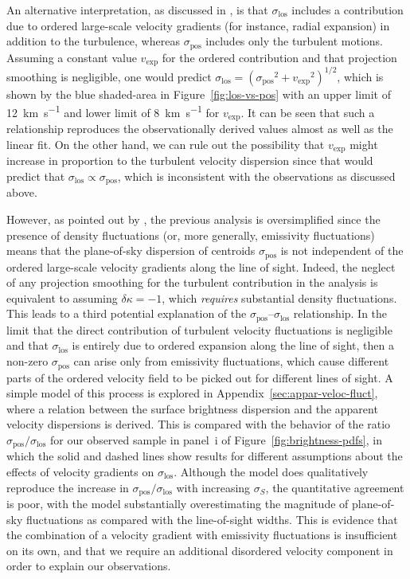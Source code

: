 \documentclass[fleqn,usenatbib, useAMS, a4paper]{mnras}
\newcommand\pos{\ensuremath{_{\mathrm{pos}}}}
\newcommand\los{\ensuremath{_{\mathrm{los}}}}
\begin{document}
\newcommand\vexp{\ensuremath{v_{\text{exp}}}}
An alternative interpretation,
as discussed in \citet{2011MNRAS.413..705L},
is that \(\sigma\los\) includes a contribution due to
ordered large-scale velocity gradients
(for instance, radial expansion)
in addition to the turbulence,
whereas \(\sigma\pos\) includes only the turbulent motions. 
Assuming a constant value \vexp{} for the ordered contribution
and that projection smoothing is negligible,
one would predict \(\sigma\los = (\sigma\pos^2 + \vexp^2)^{1/2}\),
which is shown by the blue shaded-area in Figure~\ref{fig:los-vs-pos}
with an upper limit of \SI{12}{km.s^{-1}} and lower limit of \SI{8}{km.s^{-1}} for \(\vexp\).
It can be seen that such a relationship reproduces the 
observationally derived values almost as well as the linear fit.
On the other hand, we can rule out the possibility that
\vexp{} might increase in proportion to the turbulent velocity dispersion
since that would predict that \(\sigma\los \propto \sigma\pos\),
which is inconsistent with the observations as discussed above.

However, as pointed out by \citet{arthur2016turbulence},
the previous analysis is oversimplified since the presence
of density fluctuations (or, more generally, emissivity fluctuations)
means that the plane-of-sky dispersion of centroids \(\sigma\pos\)
is not independent of the 
ordered large-scale velocity gradients along the line of sight.
Indeed, the neglect of any projection smoothing for the turbulent contribution
in the \citeauthor{2011MNRAS.413..705L} analysis is equivalent to
assuming \(\delta\kappa = -1\), which \emph{requires} substantial density fluctuations. 
This leads to a third potential explanation of the
\(\sigma\pos\)--\(\sigma\los\) relationship.
In the limit that the direct contribution of
turbulent velocity fluctuations is negligible
and that \(\sigma\los\) is entirely due to ordered expansion along the line of sight,
then a non-zero \(\sigma\pos\) can arise only from emissivity fluctuations,
which cause different parts of the ordered velocity field to be picked out
for different lines of sight.
A simple model of this process is explored in Appendix~\ref{sec:appar-veloc-fluct},
where a relation between the surface brightness dispersion and the apparent
velocity dispersions is derived.
This is compared with the behavior of the ratio
\(\sigma\pos / \sigma\los\) for
our observed sample in panel~i of Figure~\ref{fig:brightness-pdfs},
in which the solid and dashed lines show results for different assumptions
about the effects of velocity gradients on \(\sigma\los\).
Although the model does qualitatively reproduce the increase
in \(\sigma\pos / \sigma\los\) with increasing \(\sigma_S\), the quantitative agreement
is poor, with the model substantially overestimating the magnitude of
plane-of-sky fluctuations as compared with the line-of-sight widths.
This is evidence that the combination of a velocity gradient with
emissivity fluctuations is insufficient on its own,
and that we require an additional disordered velocity component
in order to explain our observations.
\end{document}
